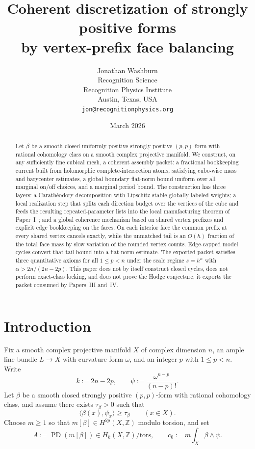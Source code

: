 \documentclass[11pt]{article}
\title{Coherent discretization of strongly positive forms\\by vertex-prefix face balancing}
\author{Jonathan Washburn\\
Recognition Science\\
Recognition Physics Institute\\
Austin, Texas, USA\\
\texttt{jon@recognitionphysics.org}}
\date{March 2026}
\numberwithin{equation}{section}
\theoremstyle{plain}
\theoremstyle{definition}
\theoremstyle{remark}
\DeclareMathOperator{\PD}{PD}
\newcommand{\Z}{\mathbb{Z}}
\begin{document}
\maketitle

\begin{abstract}
Let $\beta$ be a smooth closed uniformly positive strongly positive $(p,p)$-form with rational cohomology class on a smooth complex projective manifold.  We construct, on any sufficiently fine cubical mesh, a coherent assembly packet: a fractional bookkeeping current built from holomorphic complete-intersection atoms, satisfying cube-wise mass and barycenter estimates, a global boundary flat-norm bound uniform over all marginal on/off choices, and a marginal period bound.  The construction has three layers: a Carath\'eodory decomposition with Lipschitz-stable globally labeled weights; a local realization step that splits each direction budget over the vertices of the cube and feeds the resulting repeated-parameter lists into the local manufacturing theorem of Paper~I~\cite[Thm.~1.1]{Washburn26I}; and a global coherence mechanism based on shared vertex prefixes and explicit edge bookkeeping on the faces.  On each interior face the common prefix at every shared vertex cancels exactly, while the unmatched tail is an $O(h)$ fraction of the total face mass by slow variation of the rounded vertex counts.  Edge-capped model cycles convert that tail bound into a flat-norm estimate.  The exported packet satisfies three quantitative axioms for all $1\le p<n$ under the scale regime $s=h^\alpha$ with $\alpha>2n/(2n-2p)$.  This paper does not by itself construct closed cycles, does not perform exact-class locking, and does not prove the Hodge conjecture; it exports the packet consumed by Papers~III and~IV.
\end{abstract}

\section{Introduction}

Fix a smooth complex projective manifold $X$ of complex dimension $n$, an ample line bundle $L\to X$ with curvature form $\omega$, and an integer $p$ with $1\le p<n$.  Write
\[
k:=2n-2p,
\qquad
\psi:=\frac{\omega^{n-p}}{(n-p)!}.
\]
Let $\beta$ be a smooth closed strongly positive $(p,p)$-form with rational cohomology class, and assume there exists $\tau_\beta>0$ such that
\[
\langle\beta(x),\psi_x\rangle\ge \tau_\beta
\qquad (x\in X).
\]
Choose $m\ge 1$ so that $m[\beta]\in H^{2p}(X,\Z)$ modulo torsion, and set
\[
A:=\PD(m[\beta])\in H_k(X,\Z)/\mathrm{tors},
\qquad
c_0:=m\int_X \beta\wedge\psi.
\]
\end{document}
